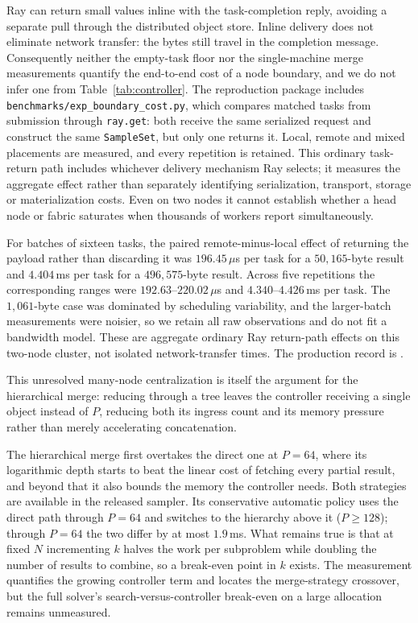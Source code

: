 \documentclass[12pt,a4paper]{elsarticle}
\begin{document}
Ray can return small values inline with the task-completion reply, avoiding a separate pull
through the distributed object store. Inline delivery does not eliminate network transfer: the
bytes still travel in the completion message. Consequently neither the empty-task floor nor the
single-machine merge measurements quantify the end-to-end cost of a node boundary, and we do
not infer one from Table~\ref{tab:controller}. The reproduction package includes
\texttt{benchmarks/exp\_boundary\_cost.py}, which compares matched tasks from submission through
\texttt{ray.get}: both receive the same serialized request and construct the same
\texttt{SampleSet}, but only one returns it. Local, remote and mixed placements are measured,
and every repetition is retained. This ordinary task-return path includes whichever delivery
mechanism Ray selects; it measures the aggregate effect rather than separately identifying
serialization, transport, storage or materialization costs. Even on two nodes it cannot
establish whether a head node or fabric saturates when thousands of workers report
simultaneously.

For batches of sixteen tasks, the paired remote-minus-local effect of returning the payload
rather than discarding it was $196.45$\,$\mu$s per task for a $50{,}165$-byte result and
$4.404$\,ms per task for a $496{,}575$-byte result. Across five repetitions the corresponding
ranges were $192.63$--$220.02$\,$\mu$s and $4.340$--$4.426$\,ms per task. The $1{,}061$-byte
case was dominated by scheduling variability, and the larger-batch measurements were noisier,
so we retain all raw observations and do not fit a bandwidth model. These are aggregate
ordinary Ray return-path effects on this two-node cluster, not isolated network-transfer
times. The production record is
.

This unresolved many-node centralization is itself the argument for the hierarchical merge: reducing
through a tree leaves the controller receiving a single object instead of $P$, reducing both
its ingress count and its memory pressure rather than merely accelerating concatenation.

The hierarchical merge first overtakes the direct one at $P=64$, where its
logarithmic depth starts to beat the linear cost of fetching every partial result,
and beyond that it also bounds the memory the controller needs. Both strategies are
available in the released sampler. Its conservative automatic policy uses the direct path
through $P=64$ and switches to the hierarchy above it ($P\geq128$); through $P=64$ the two
differ by at most $1.9$\,ms. What remains
true is that at fixed $N$ incrementing $k$ halves the work per subproblem while
doubling the number of results to combine, so a break-even point in $k$ exists. The
measurement quantifies the growing controller term and locates the merge-strategy
crossover, but the full solver's search-versus-controller break-even on a large allocation
remains unmeasured.
\end{document}
